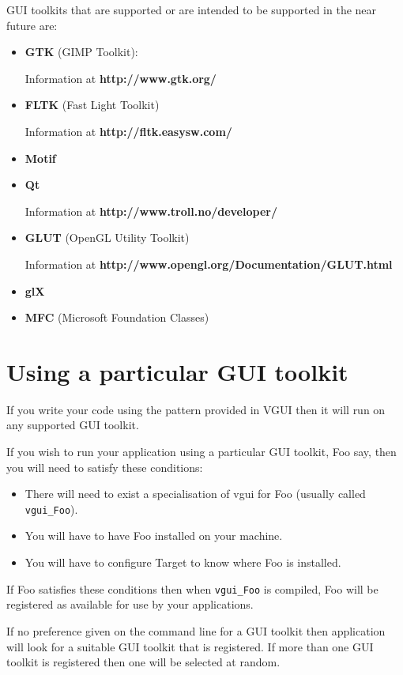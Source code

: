 \documentclass[12pt]{report} \usepackage{epsfig}
\begin{document}
GUI toolkits that are supported or are intended to be supported in the near future are:
\begin{itemize}
\item {\bf GTK} (GIMP Toolkit): 

  Information at {\bf http://www.gtk.org/}

\item {\bf FLTK}  (Fast Light Toolkit)
  
  Information at {\bf http://fltk.easysw.com/}

\item {\bf Motif}

\item {\bf Qt} 

  Information at {\bf http://www.troll.no/developer/}

\item {\bf GLUT} (OpenGL Utility Toolkit)

  Information at {\bf http://www.opengl.org/Documentation/GLUT.html} 

\item {\bf glX}

\item {\bf MFC} (Microsoft Foundation Classes)
\end{itemize}

\section{Using a particular GUI toolkit}
If you write your code using the pattern provided in VGUI then it will run on any
supported GUI toolkit.
 
If you wish to run your application using a particular GUI toolkit, Foo say, then
you will need to satisfy these conditions:
\begin{itemize}
\item There will need to exist a specialisation of vgui for Foo (usually called {\tt vgui\_Foo}).
\item You will have to have Foo installed on your machine.
\item You will have to configure Target to know where Foo is installed. 
\end{itemize}
If Foo satisfies these conditions then when {\tt vgui\_Foo} is compiled, Foo will be registered
as available for use by your applications.
 
If no preference given on the command line for a GUI toolkit then application will look for
a suitable GUI toolkit that is registered.  If more than one GUI toolkit is registered then one 
will be selected at random.  
\end{document}
